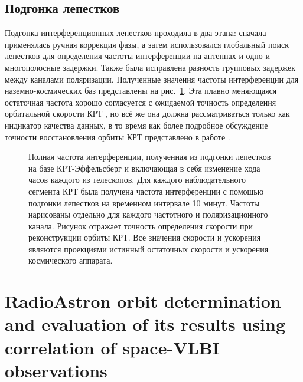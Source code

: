 \subsection{Подгонка лепестков}

Подгонка интерференционных лепестков проходила в два этапа: сначала применялась ручная коррекция
фазы, а затем использовался глобальный поиск лепестков для определения частоты интерференции на
антеннах и одно и многополосные задержки. Также была исправлена разность групповых задержек между
каналами поляризации. Полученные значения частоты интерференции для наземно-космических баз
представлены на рис.~\ref{fig:0642_rate}. Эта плавно меняющаяся остаточная частота
хорошо согласуется с ожидаемой точность определения орбитальной скорости КРТ
\cite{Kardashev_2013_rus}, но всё же она должна
рассматриваться только как индикатор качества данных, в то время как более подробное обсуждение
точности восстановления орбиты КРТ представлено в работе \cite{Duev_2015}.

\begin{figure}[]
 \caption{Полная частота интерференции, полученная из подгонки лепестков на базе КРТ-Эффельсберг и
включающая в себя изменение хода часов каждого из телескопов. Для каждого наблюдательного сегмента
КРТ была получена частота интерференции с помощью подгонки лепестков на временном интервале 10
минут. Частоты нарисованы отдельно для каждого частотного и поляризационного канала. Рисунок
отражает точность определения скорости при реконструкции орбиты КРТ. Все значения скорости и
ускорения являются проекциями истинный остаточных скорости и ускорения космического аппарата.}
 \label{fig:0642_rate}
\end{figure}


\section{RadioAstron orbit determination and evaluation of its results using correlation of
space-VLBI observations}
